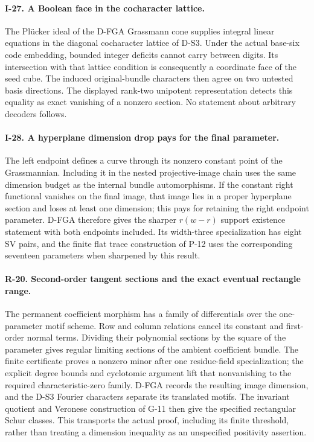 \documentclass[11pt,a4paper]{article}
\theoremstyle{definition}\newtheorem{definition}{Definition}
\begin{document}
\paragraph{I-27. A Boolean face in the cocharacter lattice.}
The Pl\"ucker ideal of the D-FGA Grassmann cone supplies integral linear
equations in the diagonal cocharacter lattice of D-S3. Under the actual
base-six code embedding, bounded integer deficits cannot carry between
digits. Its intersection with that lattice condition is consequently a
coordinate face of the seed cube. The induced original-bundle characters
then agree on two untested basis directions. The displayed rank-two
unipotent representation detects this equality as exact vanishing of a
nonzero section. No statement about arbitrary decoders follows.

\paragraph{I-28. A hyperplane dimension drop pays for the final parameter.}
The left endpoint defines a curve through its nonzero constant point of
the Grassmannian. Including it in the nested projective-image chain uses
the same dimension budget as the internal bundle automorphisms. If the
constant right functional vanishes on the final image, that image lies
in a proper hyperplane section and loses at least one dimension; this
pays for retaining the right endpoint parameter. D-FGA therefore gives
the sharper $r(w-r)$ support existence statement with both endpoints
included. Its width-three specialization has eight SV pairs, and the
finite flat trace construction of P-12 uses the corresponding seventeen
parameters when sharpened by this result.


\paragraph{R-20. Second-order tangent sections and the exact eventual rectangle range.}
The permanent coefficient morphism has a family of differentials over
the one-parameter motif scheme. Row and column relations cancel its
constant and first-order normal terms. Dividing their polynomial
sections by the square of the parameter gives regular limiting sections
of the ambient coefficient bundle. The finite certificate proves a
nonzero minor after one residue-field specialization; the explicit
degree bounds and cyclotomic argument lift that nonvanishing to the
required characteristic-zero family. D-FGA records the resulting image
dimension, and the D-S3 Fourier characters separate its translated
motifs. The invariant quotient and Veronese construction of G-11 then
give the specified rectangular Schur classes. This transports the
actual proof, including its finite threshold, rather than treating a
dimension inequality as an unspecified positivity assertion.
\end{document}
